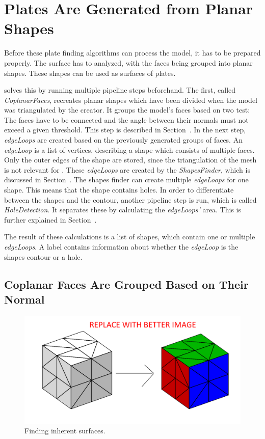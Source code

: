 \documentclass[../ClassicThesis.tex]{subfiles}
\begin{document}
\section{Plates Are Generated from Planar Shapes}

Before these plate finding algorithms can process the model, it has to be prepared properly. The surface has to analyzed, with the faces being grouped into planar shapes. These shapes can be used as surfaces of plates. 

\platener{} solves this by running multiple pipeline steps beforehand. The first, called \emph{CoplanarFaces}, recreates planar shapes which have been divided when the model was triangulated by the creator. It groups the model's faces based on two test: The faces have to be connected and the angle between their normals must not exceed a given threshold. This step is described in Section~. In the next step, \emph{edgeLoops} are created based on the previously generated groups of faces. An \emph{edgeLoop} is a list of vertices, describing a shape which consists of multiple faces. Only the outer edges of the shape are stored, since the triangulation of the mesh is not relevant for \platener{}. These \emph{edgeLoops} are created by the \emph{ShapesFinder}, which is discussed in Section~. The shapes finder can create multiple \emph{edgeLoops} for one shape. This means that the shape contains holes. In order to differentiate between the shapes and the contour, another pipeline step is run, which is called \emph{HoleDetection}. It separates these by calculating the \emph{edgeLoops'} area. This is further explained in Section~.

The result of these calculations is a list of shapes, which contain one or multiple \emph{edgeLoops}. A label contains information about whether the \emph{edgeLoop} is the shapes contour or a hole.

\subsection{Coplanar Faces Are Grouped Based on Their Normal}\label{sub:coplanarfaces}

\begin{figure}
    \centering
    \includegraphics[width=1.0\columnwidth]{Images/plates_coplanar.png}
    \caption{Finding inherent surfaces.}
    \label{fig:coplanar}
\end{figure}
\end{document}

